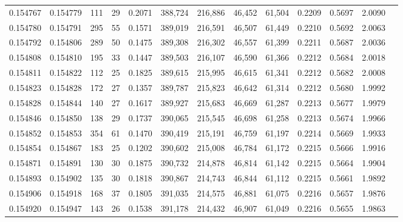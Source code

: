 \begin{tabular}{rrrrrrrrrrrrr}
0.154767 & 0.154779 &   111 &  29 &                                     0.2071 & 388,724 & 216,886 &  46,452 &  61,504 & 0.2209 & 0.5697 & 2.0090 \\
0.154780 & 0.154791 &   295 &  55 &                                     0.1571 & 389,019 & 216,591 &  46,507 &  61,449 & 0.2210 & 0.5692 & 2.0063 \\
0.154792 & 0.154806 &   289 &  50 &                                     0.1475 & 389,308 & 216,302 &  46,557 &  61,399 & 0.2211 & 0.5687 & 2.0036 \\
0.154808 & 0.154810 &   195 &  33 &                                     0.1447 & 389,503 & 216,107 &  46,590 &  61,366 & 0.2212 & 0.5684 & 2.0018 \\
0.154811 & 0.154822 &   112 &  25 &                                     0.1825 & 389,615 & 215,995 &  46,615 &  61,341 & 0.2212 & 0.5682 & 2.0008 \\
0.154823 & 0.154828 &   172 &  27 &                                     0.1357 & 389,787 & 215,823 &  46,642 &  61,314 & 0.2212 & 0.5680 & 1.9992 \\
0.154828 & 0.154844 &   140 &  27 &                                     0.1617 & 389,927 & 215,683 &  46,669 &  61,287 & 0.2213 & 0.5677 & 1.9979 \\
0.154846 & 0.154850 &   138 &  29 &                                     0.1737 & 390,065 & 215,545 &  46,698 &  61,258 & 0.2213 & 0.5674 & 1.9966 \\
0.154852 & 0.154853 &   354 &  61 &                                     0.1470 & 390,419 & 215,191 &  46,759 &  61,197 & 0.2214 & 0.5669 & 1.9933 \\
0.154854 & 0.154867 &   183 &  25 &                                     0.1202 & 390,602 & 215,008 &  46,784 &  61,172 & 0.2215 & 0.5666 & 1.9916 \\
0.154871 & 0.154891 &   130 &  30 &                                     0.1875 & 390,732 & 214,878 &  46,814 &  61,142 & 0.2215 & 0.5664 & 1.9904 \\
0.154893 & 0.154902 &   135 &  30 &                                     0.1818 & 390,867 & 214,743 &  46,844 &  61,112 & 0.2215 & 0.5661 & 1.9892 \\
0.154906 & 0.154918 &   168 &  37 &                                     0.1805 & 391,035 & 214,575 &  46,881 &  61,075 & 0.2216 & 0.5657 & 1.9876 \\
0.154920 & 0.154947 &   143 &  26 &                                     0.1538 & 391,178 & 214,432 &  46,907 &  61,049 & 0.2216 & 0.5655 & 1.9863 \\

\end{tabular}
